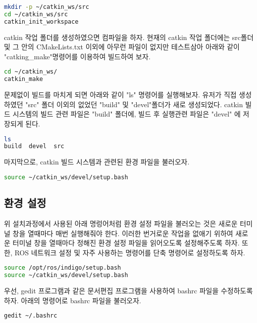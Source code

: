 \begin{lstlisting}[language=bash]
mkdir -p ~/catkin_ws/src
cd ~/catkin_ws/src
catkin_init_workspace
\end{lstlisting}

catkin 작업 폴더를 생성하였으면 컴파일을 하자. 현재의 catkin 작업 폴더에는 src폴더 및 그 안의 CMakeLists.txt 이외에 아무런 파일이 없지만 테스트삼아 아래와 같이 "catking\_make"명령어를 이용하여 빌드하여 보자. 

\begin{lstlisting}[language=bash]
cd ~/catkin_ws/
catkin_make
\end{lstlisting}

문제없이 빌드를 마치게 되면 아래와 같이 "ls" 명령어를 실행해보자. 유저가 직접 생성하였던 "src" 폴더 이외의 없었던 "build" 및 "devel"폴더가 새로 생성되었다. catkin 빌드 시스템의 빌드 관련 파일은 "build" 폴더에, 빌드 후 실행관련 파일은 "devel" 에 저장되게 된다.

\begin{lstlisting}[language=bash]
ls
build  devel  src
\end{lstlisting}

마지막으로, catkin 빌드 시스템과 관련된 환경 파일을 불러오자. 

\begin{lstlisting}[language=bash]
source ~/catkin_ws/devel/setup.bash
\end{lstlisting}

\subsection{환경 설정}

위 설치과정에서 사용된 아래 명렁어처럼 환경 설정 파일을 불러오는 것은 새로운 터미널 창을 열때마다 매번 실행해줘야 한다. 이러한 번거로운 작업을 없애기 위하여 새로운 터미널 창을 열때마다 정해진 환경 설정 파일을 읽어오도록 설정해주도록 하자. 또한, ROS 네트워크 설정 및 자주 사용하는 명령어를 단축 명령어로 설정하도록 하자.

\begin{lstlisting}[language=bash]
source /opt/ros/indigo/setup.bash
source ~/catkin_ws/devel/setup.bash
\end{lstlisting}

우선, gedit 프로그램과 같은 문서편집 프로그램을 사용하여 bashrc 파일을 수정하도록 하자. 아래의 명령어로 bashrc 파일을 불러오자.

\begin{lstlisting}[language=bash]
gedit ~/.bashrc
\end{lstlisting}

